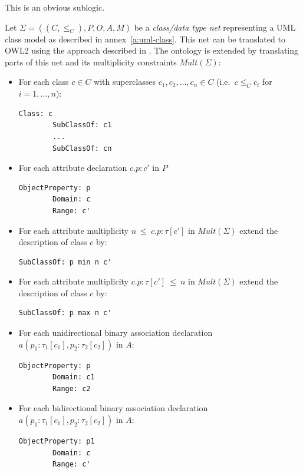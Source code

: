 \documentclass[10pt, a4paper]{isov2}
\begin{document}
This is an obvious sublogic.


Let $\Sigma = ((C, {\leq_C}), P, O, A, M)$ be a \emph{class/data type net} representing a UML 
class model as described in annex~\ref{a:uml-class}. This net can be translated to OWL2 using the approach described in \cite{zedlitz2012uml}.
The ontology is extended by translating parts of this net and its multiplicity constraints $\mathit{Mult}(\Sigma)$:
\begin{itemize}
\item For each class $c \in C$ with superclasses $c_1,c_2,\ldots,c_n \in C$ (i.e.\ $c \leq_C c_i$ for $i=1,\ldots,n$):
\begin{lstlisting}[language=owl2Manchester]
	Class: c
		SubClassOf: c1
		...
		SubClassOf: cn
\end{lstlisting}
\item For each attribute declaration $c.p:c'$ in $P$
\begin{lstlisting}[language=owl2Manchester]
	ObjectProperty: p
		Domain: c
		Range: c'
\end{lstlisting}

\item For each attribute multiplicity $n\ \mathsf{\leq}\ c.p:\tau[c']$ in $\mathit{Mult}(\Sigma)$ extend the description of class $c$ by:
\begin{lstlisting}[language=owl2Manchester]
	SubClassOf: p min n c'
\end{lstlisting}

\item For each attribute multiplicity $ c.p:\tau[c'] \ \mathsf{\leq}\ n$  in $\mathit{Mult}(\Sigma)$ extend the description of class $c$ by:
\begin{lstlisting}[language=owl2Manchester]
	SubClassOf: p max n c'
\end{lstlisting}

\item For each unidirectional binary association declaration $a(p_1:\tau_1[c_1],p_2:\tau_2[c_2])$ in $A$:
\begin{lstlisting}[language=owl2Manchester]
	ObjectProperty: p
		Domain: c1
		Range: c2
\end{lstlisting}
\item For each bidirectional binary association declaration $a(p_1:\tau_1[c_1],p_2:\tau_2[c_2])$ in $A$:
\begin{lstlisting}[language=owl2Manchester]
	ObjectProperty: p1
		Domain: c
		Range: c'


\end{lstlisting}
\end{itemize}
\end{document}
